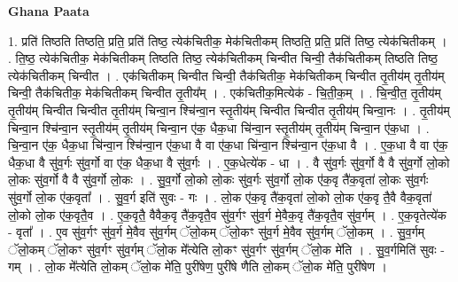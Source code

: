 \documentclass[17pt]{extarticle}
\begin{document}
\textbf{Ghana Paata } \newline

1. प्रति॑ तिष्ठति तिष्ठति॒ प्रति॒ प्रति॑ तिष्ठ॒ त्येक॑चितीक॒ मेक॑चितीकम् तिष्ठति॒ प्रति॒ प्रति॑ तिष्ठ॒ त्येक॑चितीकम् । . ति॒ष्ठ॒ त्येक॑चितीक॒ मेक॑चितीकम् तिष्ठति तिष्ठ॒ त्येक॑चितीकम् चिन्वीत चिन्वी॒ तैक॑चितीकम् तिष्ठति तिष्ठ॒ त्येक॑चितीकम् चिन्वीत । . एक॑चितीकम् चिन्वीत चिन्वी॒ तैक॑चितीक॒ मेक॑चितीकम् चिन्वीत तृ॒तीय॑म् तृ॒तीय॑म् चिन्वी॒ तैक॑चितीक॒ मेक॑चितीकम् चिन्वीत तृ॒तीय᳚म् । . एक॑चितीक॒मित्येक॑ - चि॒ती॒क॒म् । . चि॒न्वी॒त॒ तृ॒तीय॑म् तृ॒तीय॑म् चिन्वीत चिन्वीत तृ॒तीय॑म् चिन्वा॒न श्चि॑न्वा॒न स्तृ॒तीय॑म् चिन्वीत चिन्वीत तृ॒तीय॑म् चिन्वा॒नः । . तृ॒तीय॑म् चिन्वा॒न श्चि॑न्वा॒न स्तृ॒तीय॑म् तृ॒तीय॑म् चिन्वा॒न ए॑क॒ धैक॒धा चि॑न्वा॒न स्तृ॒तीय॑म् तृ॒तीय॑म् चिन्वा॒न ए॑क॒धा । . चि॒न्वा॒न ए॑क॒ धैक॒धा चि॑न्वा॒न श्चि॑न्वा॒न ए॑क॒धा वै वा ए॑क॒धा चि॑न्वा॒न श्चि॑न्वा॒न ए॑क॒धा वै । . ए॒क॒धा वै वा ए॑क॒ धैक॒धा वै सु॑व॒र्गः सु॑व॒र्गो वा ए॑क॒ धैक॒धा वै सु॑व॒र्गः । . ए॒क॒धेत्ये॑क - धा । . वै सु॑व॒र्गः सु॑व॒र्गो वै वै सु॑व॒र्गो लो॒को लो॒कः सु॑व॒र्गो वै वै सु॑व॒र्गो लो॒कः । . सु॒व॒र्गो लो॒को लो॒कः सु॑व॒र्गः सु॑व॒र्गो लो॒क ए॑क॒वृ तै॑क॒वृता॑ लो॒कः सु॑व॒र्गः सु॑व॒र्गो लो॒क ए॑क॒वृता᳚ । . सु॒व॒र्ग इति॑ सुवः - गः । . लो॒क ए॑क॒वृ तै॑क॒वृता॑ लो॒को लो॒क ए॑क॒वृ तै॒वै वैक॒वृता॑ लो॒को लो॒क ए॑क॒वृतै॒व । . ए॒क॒वृतै॒ वैवैक॒वृ तै॑क॒वृतै॒व सु॑व॒र्गꣳ सु॑व॒र्ग मे॒वैक॒वृ तै॑क॒वृतै॒व सु॑व॒र्गम् । . ए॒क॒वृतेत्ये॑क - वृता᳚ । . ए॒व सु॑व॒र्गꣳ सु॑व॒र्ग मे॒वैव सु॑व॒र्गम् ॅलो॒कम् ॅलो॒कꣳ सु॑व॒र्ग मे॒वैव सु॑व॒र्गम् ॅलो॒कम् । . सु॒व॒र्गम् ॅलो॒कम् ॅलो॒कꣳ सु॑व॒र्गꣳ सु॑व॒र्गम् ॅलो॒क मे᳚त्येति लो॒कꣳ सु॑व॒र्गꣳ सु॑व॒र्गम् ॅलो॒क मे॑ति । . सु॒व॒र्गमिति॑ सुवः - गम् । . लो॒क मे᳚त्येति लो॒कम् ॅलो॒क मे॑ति॒ पुरी॑षेण॒ पुरी॑षे णैति लो॒कम् ॅलो॒क मे॑ति॒ पुरी॑षेण । \newline
\end{document}
